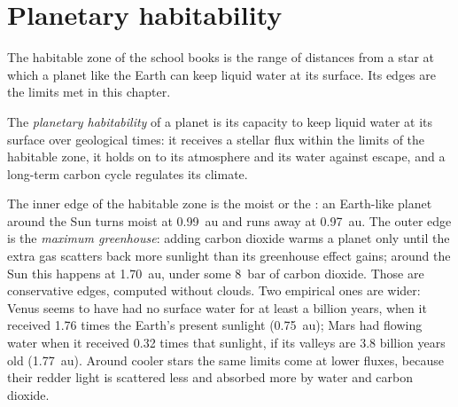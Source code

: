 \section{Planetary habitability}\label{sec:b3:planetary-atmospheres:habitability}

The habitable zone of the school books is the range of distances from a
star at which a planet like the Earth can keep liquid water at its
surface. Its edges are the limits met in this chapter.

\begin{definition}\label{def:b3:planetary-atmospheres:habitability}
The \emph{planetary habitability} of a
planet is its capacity to keep liquid water at its surface over
geological times: it receives a stellar flux within the limits of the
habitable zone, it holds on to its atmosphere and its water against
escape, and a long-term carbon cycle regulates its climate.
\end{definition}

The inner edge of the habitable zone is the moist or the : an Earth-like planet around the Sun turns moist at
\qty{0.99}{au} and runs away at \qty{0.97}{au}. The outer edge is the
\emph{maximum greenhouse}: adding carbon dioxide warms a planet only until
the extra gas scatters back more sunlight than its greenhouse effect
gains; around the Sun this happens at
\qty{1.70}{au}, under some \qty{8}{bar} of carbon dioxide. Those are
conservative edges, computed without clouds. Two empirical ones are wider:
Venus seems to have had no surface water for at least a billion years,
when it received 1.76 times the Earth's present sunlight (\qty{0.75}{au});
Mars had flowing water when it received 0.32 times that sunlight, if its
valleys are 3.8 billion years old (\qty{1.77}{au}). Around cooler stars the same limits come
at lower fluxes, because their redder light is scattered less and absorbed
more by water and carbon dioxide.

